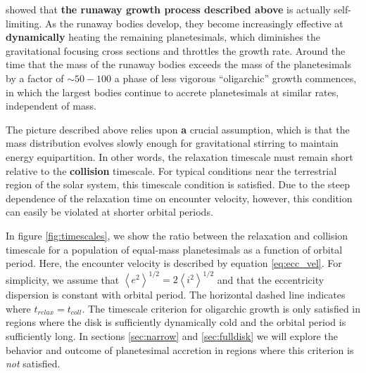 \documentclass[twocolumn,linenumbers]{aastex63}
\begin{document}
\citet{kokubo98} showed that \textbf{the runaway growth process described above} is actually self-limiting. As the runaway
bodies develop, they become increasingly effective at \textbf{dynamically} heating the
remaining planetesimals, which diminishes the
gravitational focusing cross sections and throttles the growth rate. Around the time
that the mass of the runaway bodies exceeds the mass of the planetesimals
by a factor of $\sim 50-100$
\citep{ida93} a phase of less vigorous ``oligarchic'' 
growth commences, in which the largest bodies continue to 
accrete planetesimals at similar rates, independent of mass.

The picture described above relies upon \textbf{a} crucial assumption, which
is that the mass distribution evolves slowly enough for gravitational stirring to maintain energy equipartition. In other words, the relaxation timescale must remain short relative to the \textbf{collision} timescale. For typical conditions near the terrestrial region of the solar system, this timescale condition is satisfied. Due to the steep dependence of the relaxation time on encounter velocity, however, this condition can easily be violated at shorter orbital periods.

In figure \ref{fig:timescales}, we show the ratio between the relaxation
and collision timescale for a population of equal-mass planetesimals
as a function of orbital period. Here, the encounter velocity is
described by equation \ref{eq:ecc_vel}. For
simplicity, we assume that $\left< e^2 \right>^{1/2} = 2\left< i^2
\right>^{1/2}$ \citep{ida93a} and that the eccentricity dispersion is
constant with orbital period. The horizontal
dashed line indicates where $t_{relax} = t_{coll}$. The timescale
criterion for oligarchic growth is only satisfied in regions where the
disk is sufficiently dynamically cold and the orbital period is
sufficiently long. In sections \ref{sec:narrow} and \ref{sec:fulldisk}
we will explore the behavior and outcome of planetesimal accretion in regions where this criterion is \textit{not} satisfied. 
\end{document}
